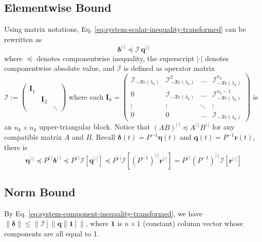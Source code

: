 \documentclass[accepted]{uai2023}
\newcommand{\vect}[1]{\mathbf{#1}}
\newcommand{\Err}{\eta}
\newcommand{\I}{\mathcal{I}}
\renewcommand{\Re}[1]{\mathcal{R}e\left(#1\right)}
\newcommand{\abs}{|\cdot|}
\begin{document}
\subsection{Elementwise Bound}
    Using matrix notations, Eq. \ref{eq:system-scalar-inequality-transformed} can be rewritten as
    \begin{equation} \label{eq:system-component-inequality-transformed}
        \pmb{\delta}^{\abs} \preceq \pmb{\I}\,\vect{q}^{\abs}
    \end{equation}
    where $\preceq$ denotes componentwise inequality, the superscript $\abs$ denotes componentwise absolute value, and $\pmb{\I}$ is defined as operator matrix $\pmb{\I} := \begin{pmatrix} \vect{I}_1 \\ & \vect{I}_2 \\ && \ddots \end{pmatrix}$ where each $\vect{I}_k = \begin{pmatrix}
        \I_{-\Re{\lambda_k}} & \I_{-\Re{\lambda_k}}^2 & \dots &\I_{-\Re{\lambda_k}}^{n_k} \\[1ex]
        0 & \I_{-\Re{\lambda_k}} & \dots &\I_{-\Re{\lambda_k}}^{n_k-1} \\
        \vdots & \vdots & \ddots & \vdots \\
        0 & 0 & \dots & \I_{-\Re{\lambda_k}}
    \end{pmatrix}$ is an $n_k \times n_k$ upper-triangular block.
    Notice that $(AB)^{\abs} \preceq A^{\abs} B^{\abs}$ for any compatible matrix $A$ and $B$. Recall $\pmb{\delta}(t) = P^{-1}\pmb{\Err}(t)$ and $\pmb{q}(t) = P^{-1} \vect{r}(t)$, there is
    \begin{equation}
        \pmb{\Err}^{\abs} 
        \preceq P^{\abs}\pmb{\delta}^{\abs} 
        \preceq P^{\abs} \pmb{\I} \left[\vect{q}^{\abs} \right]
        \preceq P^{\abs} \pmb{\I} \left[(P^{-1})^{\abs} \vect{r}^{\abs}\right]
        = P^{\abs} (P^{-1})^{\abs}  \pmb{\I} \left[\vect{r}^{\abs}\right]
    \end{equation}
\subsection{Norm Bound}
    By Eq. \ref{eq:system-component-inequality-transformed}, we have $ \|\pmb{\delta}\| \leq \big\|\pmb{\I} [\|\vect{q}\| \vect{1}]\big\|$, where $\vect{1}$ is $n \times 1$ (constant) column vector whose components are all equal to 1.
\end{document}
